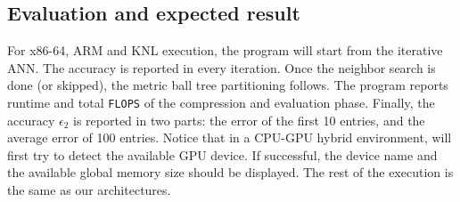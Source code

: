 %
%
%
%
%
%

\subsection{Evaluation and expected result}
For x86-64, ARM and KNL execution, the program will start from
the iterative ANN. The accuracy is reported in every iteration.
Once the neighbor search is done (or skipped), the metric ball
tree partitioning follows.
The program reports runtime and total \texttt{FLOPS} of the compression
  and evaluation phase.
Finally, the accuracy $\epsilon_2$ is reported in two parts: 
the error of the first 10 entries, and the average error of 100 entries.
Notice that in a CPU-GPU hybrid environment, \gofmm{} will
first try to detect the available GPU device. 
If successful, the device name and the available global memory
size should be displayed.
The rest of the execution is the same as our architectures. 
